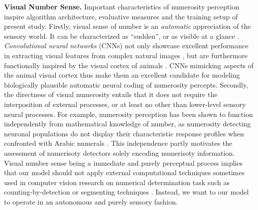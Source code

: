 \documentclass[twocolumn]{article}
\begin{document}
\newcommand{\relatedss}[2]{{\bfseries #1. }{#2}}

\relatedss{Visual Number Sense}{Important characteristics of numerosity perception inspire algorithm architecture, evaluative measures and the  training setup of present study. Firstly, visual sense of number is an \emph{automatic} appreciation of the sensory world. It can be characterized as ``sudden'', or as visible at a glance \citetext{\citealp[p.~57]{dehaene2011number}; \citealp{zhang2016salient}}. \emph{Convolutional neural networks} (CNNs) not only showcase excellent performance in extracting visual features from complex natural images \citetext{\citealp{GoogleDeepMind}; \citealp{krizhevsky2012imagenet}; \citealp[for visual number sense and CNNs see][]{zhang2016salient}}, but are furthermore functionally inspired by the visual cortex of animals \citep[specifically cats, see][]{lecun1995convolutional}. CNNs mimicking aspects of the animal visual cortex thus make them an excellent candidate for modeling biologically plausible automatic neural coding of numerosity percepts. 
Secondly, the directness of visual numerosity entails that it does not require the interposition of external processes, or at least no other than lower-level sensory neural processes. For example, numerosity perception has been shown to function independently from mathematical knowledge of number, as numerosity detecting neuronal populations do not display their characteristic response profiles when confronted with Arabic numerals \citep{harvey2013topographic, poncet2016individuation}. This independence partly motivates the assessment of numerisoty detectors solely encoding numerisoty information. Visual number sense being a immediate and purely perceptual process implies that our model should not apply external computational techniques sometimes used in computer vision research on numerical determination task such as counting-by-detection \citep[which requires both arithmetic and iterative attention to all group members, see][]{zhang2016salient, detection2016unconstrained} or segmenting techniques \citep[e.g.][]{chattopadhyay2016counting}. Instead, we want to our model to operate in an autonomous and purely sensory fashion.}
\end{document}
